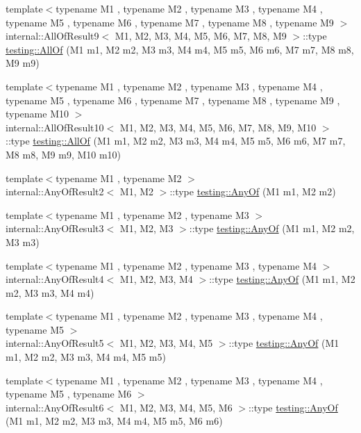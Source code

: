 \begin{DoxyCompactItemize}
\item 
{\footnotesize template$<$typename M1 , typename M2 , typename M3 , typename M4 , typename M5 , typename M6 , typename M7 , typename M8 , typename M9 $>$ }\\internal\+::\+All\+Of\+Result9$<$ M1, M2, M3, M4, M5, M6, M7, M8, M9 $>$\+::type \hyperlink{namespacetesting_aaecf2bd8eb7c68b119f9b81a01942b7f}{testing\+::\+All\+Of} (M1 m1, M2 m2, M3 m3, M4 m4, M5 m5, M6 m6, M7 m7, M8 m8, M9 m9)
\item 
{\footnotesize template$<$typename M1 , typename M2 , typename M3 , typename M4 , typename M5 , typename M6 , typename M7 , typename M8 , typename M9 , typename M10 $>$ }\\internal\+::\+All\+Of\+Result10$<$ M1, M2, M3, M4, M5, M6, M7, M8, M9, M10 $>$\+::type \hyperlink{namespacetesting_a9939c08664efeed0c1983090115f7ecb}{testing\+::\+All\+Of} (M1 m1, M2 m2, M3 m3, M4 m4, M5 m5, M6 m6, M7 m7, M8 m8, M9 m9, M10 m10)
\item 
{\footnotesize template$<$typename M1 , typename M2 $>$ }\\internal\+::\+Any\+Of\+Result2$<$ M1, M2 $>$\+::type \hyperlink{namespacetesting_a81cfefd9f75cdce827d5bc873cf73aac}{testing\+::\+Any\+Of} (M1 m1, M2 m2)
\item 
{\footnotesize template$<$typename M1 , typename M2 , typename M3 $>$ }\\internal\+::\+Any\+Of\+Result3$<$ M1, M2, M3 $>$\+::type \hyperlink{namespacetesting_a3ccbde3ba01189587676d44a4333c0a5}{testing\+::\+Any\+Of} (M1 m1, M2 m2, M3 m3)
\item 
{\footnotesize template$<$typename M1 , typename M2 , typename M3 , typename M4 $>$ }\\internal\+::\+Any\+Of\+Result4$<$ M1, M2, M3, M4 $>$\+::type \hyperlink{namespacetesting_a1cfcacf2cf19543b86445e3585d5356f}{testing\+::\+Any\+Of} (M1 m1, M2 m2, M3 m3, M4 m4)
\item 
{\footnotesize template$<$typename M1 , typename M2 , typename M3 , typename M4 , typename M5 $>$ }\\internal\+::\+Any\+Of\+Result5$<$ M1, M2, M3, M4, M5 $>$\+::type \hyperlink{namespacetesting_a049ea436e52c242adc44b2b42dc03e50}{testing\+::\+Any\+Of} (M1 m1, M2 m2, M3 m3, M4 m4, M5 m5)
\item 
{\footnotesize template$<$typename M1 , typename M2 , typename M3 , typename M4 , typename M5 , typename M6 $>$ }\\internal\+::\+Any\+Of\+Result6$<$ M1, M2, M3, M4, M5, M6 $>$\+::type \hyperlink{namespacetesting_a747189264a49a426004366371f1a2575}{testing\+::\+Any\+Of} (M1 m1, M2 m2, M3 m3, M4 m4, M5 m5, M6 m6)

\end{DoxyCompactItemize}
